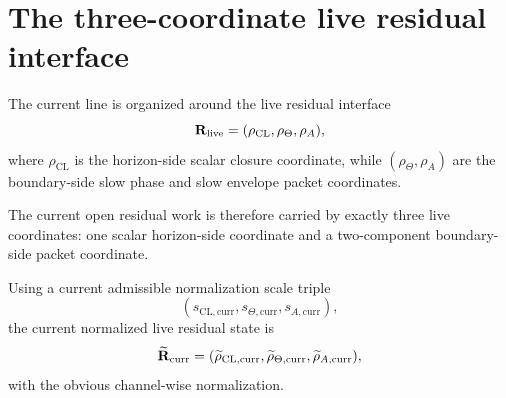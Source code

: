 \section{The three-coordinate live residual interface}
\begin{definition}\label{def:live-residual-interface}
The current line is organized around the live residual interface
\[
\mathbf{R}_{\mathrm{live}}=(\rho_{\mathrm{CL}},\rho_{\Theta},\rho_{A}),
\]
where $\rho_{\mathrm{CL}}$ is the horizon-side scalar closure coordinate, while $(\rho_{\Theta},\rho_{A})$ are the boundary-side slow phase and slow envelope packet coordinates.
\end{definition}

\begin{remark}
The current open residual work is therefore carried by exactly three live coordinates: one scalar horizon-side coordinate and a two-component boundary-side packet coordinate.
\end{remark}

\begin{definition}\label{def:current-normalized-state}
Using a current admissible normalization scale triple
\[
(s_{\mathrm{CL,curr}},s_{\Theta,\mathrm{curr}},s_{A,\mathrm{curr}}),
\]
the current normalized live residual state is
\[
\widetilde{\mathbf{R}}_{\mathrm{curr}}=(\widetilde{\rho}_{\mathrm{CL,curr}},\widetilde{\rho}_{\Theta,\mathrm{curr}},\widetilde{\rho}_{A,\mathrm{curr}}),
\]
with the obvious channel-wise normalization.
\end{definition}

